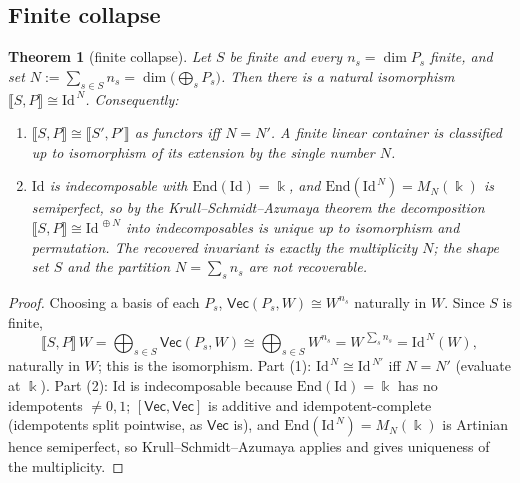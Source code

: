 \documentclass[11pt]{amsart}
\theoremstyle{plain}
\newtheorem{theorem}{Theorem}[section]
\theoremstyle{definition}
\renewcommand{\Vec}{\mathsf{Vec}}
\newcommand{\End}{\mathrm{End}}
\newcommand{\Id}{\mathrm{Id}}
\newcommand{\ext}[1]{\llbracket #1 \rrbracket}
\newcommand{\fld}{\Bbbk}
\newcommand{\iso}{\cong}
\begin{document}
\subsection{Finite collapse}

\begin{theorem}[finite collapse]\label{thm:collapse}
Let $S$ be finite and every $n_s=\dim P_s$ finite, and set
$N:=\sum_{s\in S}n_s=\dim\bigl(\bigoplus_{s}P_s\bigr)$. Then there is a natural
isomorphism $\ext{S,P}\iso\Id^{\,N}$. Consequently:
\begin{enumerate}
\item $\ext{S,P}\iso\ext{S',P'}$ as functors \emph{iff} $N=N'$. A finite linear
  container is classified up to isomorphism of its extension by the single
  number $N$.
\item $\Id$ is indecomposable with $\End(\Id)=\fld$, and $\End(\Id^{\,N})=M_N(\fld)$
  is semiperfect, so by the Krull--Schmidt--Azumaya theorem the decomposition
  $\ext{S,P}\iso\Id^{\,\oplus N}$ into indecomposables is unique up to
  isomorphism and permutation. The recovered invariant is exactly the
  multiplicity $N$; the shape set $S$ and the partition $N=\sum_s n_s$ are
  \emph{not} recoverable.
\end{enumerate}
\end{theorem}

\begin{proof}
Choosing a basis of each $P_s$, $\Vec(P_s,W)\iso W^{n_s}$ naturally in $W$.
Since $S$ is finite,
\[
  \ext{S,P}\,W=\bigoplus_{s\in S}\Vec(P_s,W)\iso\bigoplus_{s\in S}W^{n_s}
  =W^{\,\sum_s n_s}=\Id^{\,N}(W),
\]
naturally in $W$; this is the isomorphism. Part (1): $\Id^{\,N}\iso\Id^{\,N'}$
iff $N=N'$ (evaluate at $\fld$). Part (2): $\Id$ is indecomposable because
$\End(\Id)=\fld$ has no idempotents $\neq 0,1$; $[\Vec,\Vec]$ is additive and
idempotent-complete (idempotents split pointwise, as $\Vec$ is), and
$\End(\Id^{\,N})=M_N(\fld)$ is Artinian hence semiperfect, so
Krull--Schmidt--Azumaya applies and gives uniqueness of the multiplicity.
\end{proof}
\end{document}
